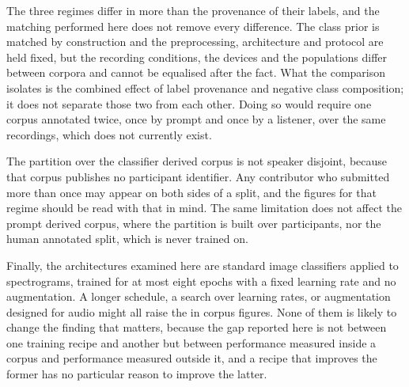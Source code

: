 The three regimes differ in more than the provenance of their labels, and the matching
performed here does not remove every difference. The class prior is matched by
construction and the preprocessing, architecture and protocol are held fixed, but the
recording conditions, the devices and the populations differ between corpora and cannot be
equalised after the fact. What the comparison isolates is the combined effect of label
provenance and negative class composition; it does not separate those two from each other.
Doing so would require one corpus annotated twice, once by prompt and once by a listener,
over the same recordings, which does not currently exist.

The partition over the classifier derived corpus is not speaker disjoint, because that
corpus publishes no participant identifier. Any contributor who submitted more than once
may appear on both sides of a split, and the figures for that regime should be read with
that in mind. The same limitation does not affect the prompt derived corpus, where the
partition is built over participants, nor the human annotated split, which is never
trained on.

Finally, the architectures examined here are standard image classifiers applied to
spectrograms, trained for at most eight epochs with a fixed learning rate and no
augmentation. A longer schedule, a search over learning rates, or augmentation designed for
audio might all raise the in corpus figures. None of them is likely to change the finding
that matters, because the gap reported here is not between one training recipe and another
but between performance measured inside a corpus and performance measured outside it, and
a recipe that improves the former has no particular reason to improve the latter.
